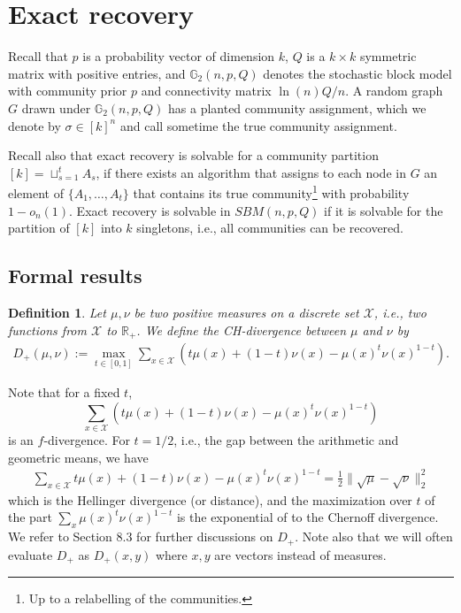 \documentclass[11pt]{article}
\newcommand{\gs}{\mathbb{G}_2}
\newcommand{\dd}{D_+}
\newcommand{\mR}{\mathbb{R}}
\newcommand{\X}{\mathcal{X}}
\newcommand{\1}{\mathbb{1}}
\newtheorem{definition}{Definition}
\begin{document}



\section{Exact recovery}\label{exact-sec}

Recall that $p$ is a probability vector of dimension $k$, $Q$ is a $k \times k$ symmetric matrix with positive entries, and 
$\gs(n,p,Q)$ denotes the stochastic block model with community prior $p$ and connectivity matrix $\ln(n)Q/n$. A random graph $G$ drawn under $\gs(n,p,Q)$ has a planted community assignment, which we denote by $\sigma \in [k]^n$ and call sometime the true community assignment. 



Recall also that exact recovery is solvable for a community partition $[k] = \sqcup_{s=1}^t A_s$, if there exists an algorithm that assigns to each node in $G$ an element of $\{A_1,\dots,A_t\}$ that contains its true community\footnote{Up to a relabelling of the communities.} with probability $1-o_n(1)$.  Exact recovery is solvable in $SBM(n,p,Q)$ if it is solvable for the partition of $[k]$ into $k$ singletons, i.e., all communities can be recovered. %



\subsection{Formal results}
\begin{definition}
Let $\mu,\nu$ be two positive measures on a discrete set $\X$, i.e., two functions from $\mathcal{X}$ to $\mR_+$. We define the CH-divergence between $\mu$ and $\nu$ by 
\begin{align} 
\dd(\mu, \nu) :=\max_{t \in [0,1]} \sum_{x \in \X} \left( t \mu(x) + (1-t)\nu(x)- \mu(x)^t \nu(x)^{1-t} \right). \label{h-div}
\end{align}
\end{definition}
Note that for a fixed $t$, $$\sum_{x \in \X} \left( t \mu(x) + (1-t)\nu(x)- \mu(x)^t \nu(x)^{1-t} \right)$$ is an $f$-divergence. 
For $t=1/2$, i.e., the gap between the arithmetic and geometric means, we have
\begin{align}
\sum_{x \in \X} t\mu(x) + (1-t)\nu(x)- \mu(x)^t \nu(x)^{1-t} = \frac{1}{2} \| \sqrt{\mu}- \sqrt{\nu} \|_2^2
\end{align}
which is the Hellinger divergence (or distance), and the maximization over $t$ of the part $\sum_x \mu(x)^t \nu(x)^{1-t}$ is the exponential of to the Chernoff divergence. 
We refer to Section 8.3 for further discussions on $\dd$. Note also that we will often evaluate $\dd$ as $\dd(x,y)$ where $x,y$ are vectors instead of measures.  
\end{document}
